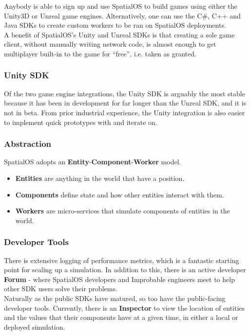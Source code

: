\documentclass[a4paper,12pt,titlepage]{article}
\begin{document}
Anybody is able to sign up and use SpatialOS to build games using either the Unity3D or Unreal game engines. Alternatively, one can use the C\#, C++ and Java SDKs to create custom workers to be ran on SpatialOS deployments. \\

A benefit of SpatialOS's Unity and Unreal SDKs is that creating a sole game client, without manually writing network code, is almost enough to get multiplayer built-in to the game for ``free'', i.e. taken as granted.

\subsubsection{Unity SDK}
Of the two game engine integrations, the Unity SDK is arguably the most stable because it has been in development for far longer than the Unreal SDK, and it is not in beta. From prior industrial experience, the Unity integration is also easier to implement quick prototypes with and iterate on.

\subsubsection{Abstraction}
SpatialOS adopts an \textbf{Entity}-\textbf{Component}-\textbf{Worker} model.
\begin{itemize}
  \item \textbf{Entities} are anything in the world that have a position.
  \item \textbf{Components} define state and how other entities interact with them.
  \item \textbf{Workers} are micro-services that simulate components of entities in the world.
\end{itemize}

\subsubsection{Developer Tools}
There is extensive logging of performance metrics, which is a fantastic starting point for scaling up a simulation\cite{Brighting}. In addition to this, there is an active developer \textbf{Forum} - where SpatialOS developers and Improbable engineers meet to help other SDK users solve their problems\cite{ImprobableWorldsLtd.2018c}. \\

Naturally as the public SDKs have matured, so too have the public-facing developer tools. Currently, there is an \textbf{Inspector} to view the location of entities and the values that their components have at a given time, in either a local or deployed simulation.
\end{document}
